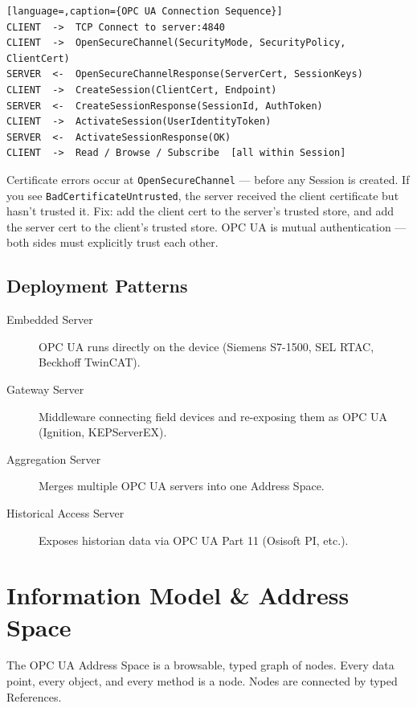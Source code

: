 \documentclass[12pt,twoside,openright]{memoir}
\begin{document}
\begin{lstlisting}[language=,caption={OPC UA Connection Sequence}]
CLIENT  ->  TCP Connect to server:4840
CLIENT  ->  OpenSecureChannel(SecurityMode, SecurityPolicy, ClientCert)
SERVER  <-  OpenSecureChannelResponse(ServerCert, SessionKeys)
CLIENT  ->  CreateSession(ClientCert, Endpoint)
SERVER  <-  CreateSessionResponse(SessionId, AuthToken)
CLIENT  ->  ActivateSession(UserIdentityToken)
SERVER  <-  ActivateSessionResponse(OK)
CLIENT  ->  Read / Browse / Subscribe  [all within Session]
\end{lstlisting}

\begin{fieldgotcha}
Certificate errors occur at \texttt{OpenSecureChannel} --- before any Session is created. If you see
\texttt{BadCertificateUntrusted}, the server received the client certificate but hasn't trusted it.
Fix: add the client cert to the server's trusted store, and add the server cert to the client's trusted store.
OPC UA is mutual authentication --- both sides must explicitly trust each other.
\end{fieldgotcha}

\section{Deployment Patterns}

\begin{description}
  \item[Embedded Server] OPC UA runs directly on the device (Siemens S7-1500, SEL RTAC, Beckhoff TwinCAT).
  \item[Gateway Server] Middleware connecting field devices and re-exposing them as OPC UA (Ignition, KEPServerEX).
  \item[Aggregation Server] Merges multiple OPC UA servers into one Address Space.
  \item[Historical Access Server] Exposes historian data via OPC UA Part 11 (Osisoft PI, etc.).
\end{description}

\chapter{Information Model \& Address Space}

The OPC UA Address Space is a browsable, typed graph of nodes. Every data point, every object, and every method
is a node. Nodes are connected by typed References.
\end{document}
